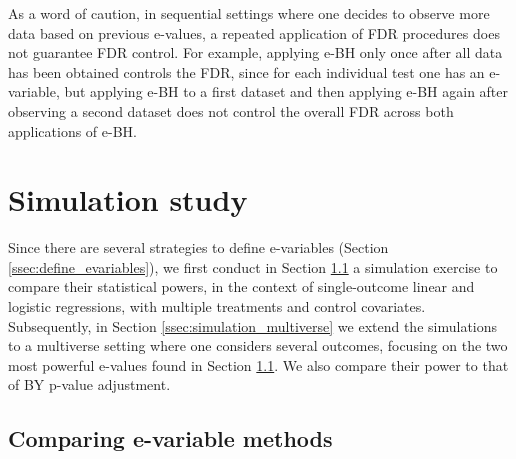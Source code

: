 \documentclass[pdflatex,sn-mathphys-num]{sn-jnl}%
\theoremstyle{thmstyleone}%
\theoremstyle{thmstyletwo}%
\theoremstyle{thmstylethree}%
\begin{document}

As a word of caution, in sequential settings where one decides to observe more data based on previous e-values, a repeated application of FDR procedures does not guarantee FDR control. For example, applying e-BH only once after all data has been obtained controls the FDR, since for each individual test one has an e-variable, but applying e-BH to a first dataset and then applying e-BH again after observing a second dataset does not control the overall FDR across both applications of e-BH.
\color{black}


\section{Simulation study}
\label{sec:simulation}

\color{blue}
Since there are several strategies to define e-variables (Section \ref{ssec:define_evariables}), we first conduct in Section \ref{ssec:simstudy_evalues} a simulation exercise to compare their statistical powers, in the context of single-outcome linear and logistic regressions, with multiple treatments and control covariates.
Subsequently, in Section \ref{ssec:simulation_multiverse} we extend the simulations to a multiverse setting where one considers several outcomes, focusing on the two most powerful e-values found in Section \ref{ssec:simstudy_evalues}. We also compare their power to that of BY p-value adjustment.
\color{black}


\subsection{Comparing e-variable methods}\label{ssec:simstudy_evalues}
\end{document}
